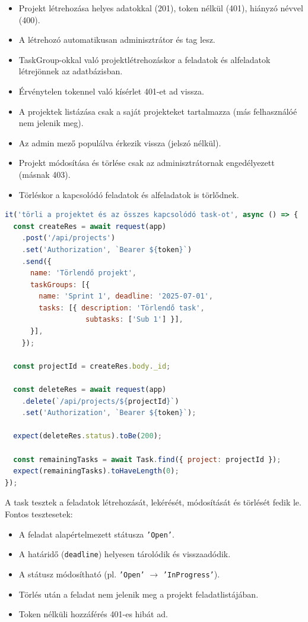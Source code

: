 \begin{itemize}
  \item Projekt létrehozása helyes adatokkal (201), token nélkül (401), hiányzó névvel (400).
  \item A létrehozó automatikusan adminisztrátor és tag lesz.
  \item TaskGroup-okkal való projektlétrehozáskor a feladatok és alfeladatok létrejönnek az adatbázisban.
  \item Érvénytelen tokennel való kísérlet 401-et ad vissza.
  \item A projektek listázása csak a saját projekteket tartalmazza (más felhasználóé nem jelenik meg).
  \item Az admin mező populálva érkezik vissza (jelszó nélkül).
  \item Projekt módosítása és törlése csak az adminisztrátornak engedélyezett (másnak 403).
  \item Törléskor a kapcsolódó feladatok és alfeladatok is törlődnek.
\end{itemize}

\begin{lstlisting}[language=JavaScript, caption={Projekt törlési teszt (projects.test.ts)}]
it('törli a projektet és az összes kapcsolódó task-ot', async () => {
  const createRes = await request(app)
    .post('/api/projects')
    .set('Authorization', `Bearer ${token}`)
    .send({
      name: 'Törlendő projekt',
      taskGroups: [{
        name: 'Sprint 1', deadline: '2025-07-01',
        tasks: [{ description: 'Törlendő task',
                   subtasks: ['Sub 1'] }],
      }],
    });

  const projectId = createRes.body._id;

  const deleteRes = await request(app)
    .delete(`/api/projects/${projectId}`)
    .set('Authorization', `Bearer ${token}`);

  expect(deleteRes.status).toBe(200);

  const remainingTasks = await Task.find({ project: projectId });
  expect(remainingTasks).toHaveLength(0);
});
\end{lstlisting}


A task tesztek a feladatok létrehozását, lekérését, módosítását és törlését fedik le. Fontos tesztesetek:

\begin{itemize}
  \item A feladat alapértelmezett státusza \texttt{'Open'}.
  \item A határidő (\texttt{deadline}) helyesen tárolódik és visszaadódik.
  \item A státusz módosítható (pl. \texttt{'Open'} $\rightarrow$ \texttt{'InProgress'}).
  \item Törlés után a feladat nem jelenik meg a projekt feladatlistájában.
  \item Token nélküli hozzáférés 401-es hibát ad.
\end{itemize}

